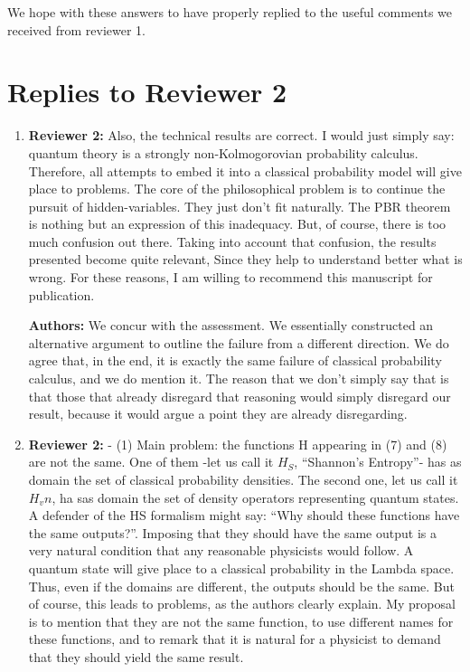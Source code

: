 \documentclass[11pt, executivepaper]{article}
\begin{document}
We hope with these answers to have properly replied to the useful comments we received from reviewer 1. 

\section{Replies to Reviewer 2}

\begin{enumerate}
	\item \textbf{Reviewer 2:} Also, the technical results are correct. I would just simply say: quantum theory is a strongly non-Kolmogorovian probability calculus. Therefore, all attempts to embed it into a classical probability model will give place to problems. The core of the philosophical problem is to continue the pursuit of hidden-variables. They just don’t fit naturally. The PBR theorem is nothing but an expression of this inadequacy. But, of course, there is too much confusion out there. Taking into account that confusion, the results presented become quite relevant, Since they help to understand better what is wrong. For these reasons, I am willing to recommend this manuscript for publication.
	\vspace{2mm}
	
	\textbf{Authors:} We concur with the assessment. We essentially constructed an alternative argument to outline the failure from a different direction. We do agree that, in the end, it is exactly the same failure of classical probability calculus, and we do mention it. The reason that we don't simply say that is that those that already disregard that reasoning would simply disregard our result, because it would argue a point they are already disregarding.
	
	
	\item \textbf{Reviewer 2:} - (1)    Main problem: the functions H appearing in (7) and (8) are not the same. One of them -let us call it $H_S$, “Shannon’s Entropy”- has as domain the set of classical probability densities. The second one, let us call it $H_vn$, ha sas domain the set of density operators representing quantum states. A defender of the HS formalism might say: “Why should these functions have the same outputs?”. Imposing that they should have the same output is a very natural condition that any reasonable physicists would follow. A quantum state will give place to a classical probability in the Lambda space. Thus, even if the domains are different, the outputs should be the same. But of course, this leads to problems, as the authors clearly explain. My proposal is to mention that they are not the same function, to use different names for these functions, and to remark that it is natural for a physicist to demand that they should yield the same result.  
	\vspace{2mm}
	

\end{enumerate}
\end{document}
